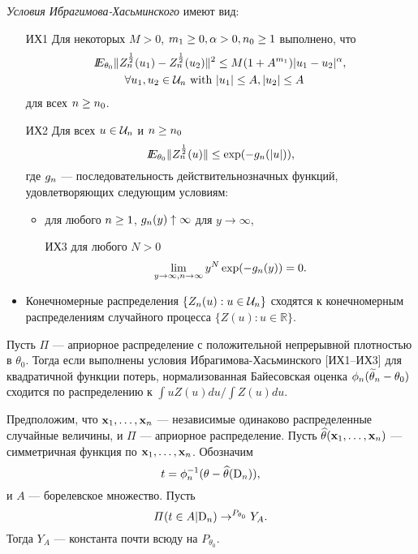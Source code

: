 \textit{Условия Ибрагимова-Хасьминского} имеют вид:
\begin{itemize}
\item[ИХ1] Для некоторых $M > 0$, $m_1 \geq 0, \alpha > 0, n_0 \geq 1$ выполнено, что
\begin{align*}
I\!\!E_{\theta_0} \| Z_{n}^{\frac12}(u_1) - Z_{n}^{\frac12}(u_2)\|^2 &\leq M (1 + A^{m_1}) |u_1 - u_2|^{\alpha}, \\
\forall u_1, u_2 \in \mathcal{U}_{n} \text{ with } &|u_1| \leq A, |u_2| \leq A
\end{align*}
для всех $n \geq n_0$.
\item[ИХ2] Для всех $u \in \mathcal{U}_{n}$ и $n \geq n_0$ 
\[
I\!\!E_{\theta_0} \|Z_{n}^{\frac12} (u) \| \leq \exp (-g_{n}(|u|)),
\]
где $g_{n}$ --- последовательность действительнозначных функций, удовлетворяющих следующим условиям:
\begin{itemize}
\item для любого $n \geq 1$, $g_{n}(y) \uparrow \infty$ для $y \rightarrow \infty$,
\item[ИХ3] для любого $N > 0$
\[
\lim_{y \rightarrow \infty, \\ n \rightarrow \infty} y^N \exp(-g_{n}(y)) = 0.
\]
\end{itemize}
\item Конечномерные распределения $\{Z_{n}(u): u \in \mathcal{U}_{n}\}$ сходятся к конечномерным распределениям случайного процесса $\{Z(u): u \in \mathbb{R}\}$.
\end{itemize}


\begin{Theorem}
Пусть $\Pi$ --- априорное распределение с положительной непрерывной плотностью в $\theta_0$. 
Тогда если выполнены условия Ибрагимова-Хасьминского [ИХ1--ИХ3] для квадратичной функции потерь, нормализованная Байесовская оценка $\phi_{n} (\widetilde{\theta}_{n} - \theta_0)$ сходится по распределению к $\int u Z(u) du / \int Z(u) du$.
\end{Theorem}

\begin{Proposition}
Предположим, что $\mathbf{x}_1, \ldots, \mathbf{x}_{n}$ --- независимые одинаково распределенные случайные величины, и $\Pi$ --- априорное распределение.
Пусть $\widehat{\theta}(\mathbf{x}_1, \ldots, \mathbf{x}_{n})$ --- симметричная функция по $\mathbf{x}_1, \ldots, \mathbf{x}_{n}$. Обозначим
\[
t = \phi_{n}^{-1} (\theta - \widehat{\theta}(\mathrm{D}_{n})),
\]
и $A$ --- борелевское множество.
Пусть
\[
\varPi(t \in A| \mathrm{D}_{n}) \rightarrow^{P_{\theta_0}} Y_A.
\]
Тогда $Y_A$ --- константа почти всюду на $P_{\theta_0}$.
\end{Proposition}

